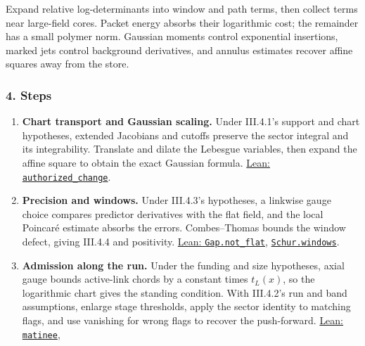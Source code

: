 \documentclass[
  letterpaper,
  11pt]{article}
\begin{document}
Expand relative log-determinants into window and path terms, then
collect terms near large-field cores. Packet energy absorbs their
logarithmic cost; the remainder has a small polymer norm. Gaussian
moments control exponential insertions, marked jets control background
derivatives, and annulus estimates recover affine squares away from the
store.

\subsubsection{4. Steps}\label{steps-6}

\begin{enumerate}
\def\labelenumi{\arabic{enumi}.}
\item
  \textbf{Chart transport and Gaussian scaling.} Under III.4.1's support
  and chart hypotheses, extended Jacobians and cutoffs preserve the
  sector integral and its integrability. Translate and dilate the
  Lebesgue variables, then expand the affine square to obtain the exact
  Gaussian formula.
  \href{https://github.com/yang-mills-group/OpenAI-YM-20261028/blob/3456e5e75cf8d4cd558955a5c7638fba2d68f464/YM/SectorNext/GAUSSIAN_SECTOR_CHANGE/Change.lean\#L137-L192}{Lean:
  \texttt{authorized\_change}}.
\item
  \textbf{Precision and windows.} Under III.4.3's hypotheses, a linkwise
  gauge choice compares predictor derivatives with the flat field, and
  the local Poincaré estimate absorbs the errors. Combes--Thomas bounds
  the window defect, giving III.4.4 and positivity.
  \href{https://github.com/yang-mills-group/OpenAI-YM-20261028/blob/3456e5e75cf8d4cd558955a5c7638fba2d68f464/YM/SectorNext/GAUSSIAN_SECTOR_CHANGE/Gap.lean\#L242-L264}{Lean:
  \texttt{Gap.not\_flat}},
  \href{https://github.com/yang-mills-group/OpenAI-YM-20261028/blob/3456e5e75cf8d4cd558955a5c7638fba2d68f464/YM/SectorNext/GAUSSIAN_SECTOR_CHANGE/Windows.lean\#L184-L239}{\texttt{Schur.windows}}.
\item
  \textbf{Admission along the run.} Under the funding and size
  hypotheses, axial gauge bounds active-link chords by a constant times
  \(t_L(x)\), so the logarithmic chart gives the standing condition.
  With III.4.2's run and band assumptions, enlarge stage thresholds,
  apply the sector identity to matching flags, and use vanishing for
  wrong flags to recover the push-forward.
  \href{https://github.com/yang-mills-group/OpenAI-YM-20261028/blob/3456e5e75cf8d4cd558955a5c7638fba2d68f464/YM/SectorNext/GAUSSIAN_SECTOR_CHANGE/Stamped.lean\#L45-L119}{Lean:
  \texttt{matinee}},

\end{enumerate}
\end{document}
